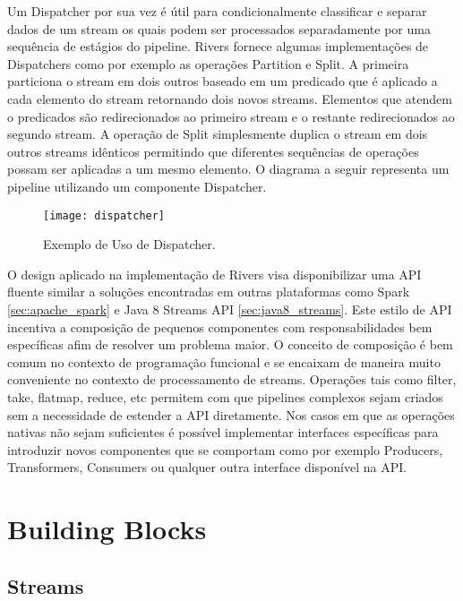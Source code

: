 Um Dispatcher por sua vez é útil para condicionalmente classificar e separar dados de um stream os quais podem ser processados separadamente por uma sequência de estágios do pipeline. Rivers fornece algumas implementações de Dispatchers como por exemplo as operações Partition e Split. A primeira particiona o stream em dois outros baseado em um predicado que é aplicado a cada elemento do stream retornando dois novos streams. Elementos que atendem o predicados são redirecionados ao primeiro stream e o restante redirecionados ao segundo stream. A operação de Split simplesmente duplica o stream em dois outros streams idênticos permitindo que diferentes sequências de operações possam ser aplicadas a um mesmo elemento. O diagrama a seguir representa um pipeline utilizando um componente Dispatcher.

\begin{figure}[H]
  \texttt{[image: dispatcher]}
  \centering
  \caption{Exemplo de Uso de Dispatcher.}
  \label{fig:rivers:dispatcher}
\end{figure}

O design aplicado na implementação de Rivers visa disponibilizar uma API fluente \cite{article:martin:fluent_interfaces} similar a soluções encontradas em outras plataformas como Spark \ref{sec:apache_spark} e Java 8 Streams API \ref{sec:java8_streams}. Este estilo de API incentiva a composição de pequenos componentes com responsabilidades bem específicas afim de resolver um problema maior. O conceito de composição é bem comum no contexto de programação funcional e se encaixam de maneira muito conveniente no contexto de processamento de streams. Operações tais como filter, take, flatmap, reduce, etc permitem com que pipelines complexos sejam criados sem a necessidade de estender a API diretamente. Nos casos em que as operações nativas não sejam suficientes é possível implementar interfaces específicas para introduzir novos componentes que se comportam como por exemplo Producers, Transformers, Consumers ou qualquer outra interface disponível na API.

\section{Building Blocks}
\label{sec:rivers:building_blocks}

\subsection{Streams}
\label{sec:rivers:streams}

